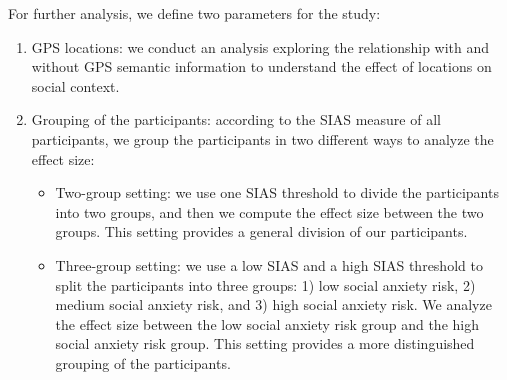 For further analysis, we define two parameters for the study:
\begin{enumerate}
\item GPS locations: we conduct an analysis exploring the relationship with and without GPS semantic information to understand the effect of locations on social context. 

\item Grouping of the participants: according to the SIAS measure of all participants, we group the participants in two different ways to analyze the effect size: 
% 
%
%
	\begin{itemize}
		\item  Two-group setting: we use one SIAS threshold to divide the participants into two groups, and then we compute the effect size between the two groups. This setting provides a general division of our participants.
		\item  Three-group setting: we use a low SIAS and a high SIAS threshold to split the participants into three groups: 1) low social anxiety risk, 2) medium social anxiety risk, and 3) high social anxiety risk.   We analyze the effect size  between the low social anxiety risk group and the high social anxiety risk group. This setting provides a more distinguished grouping of the participants.
	\end{itemize}
\end{enumerate}






